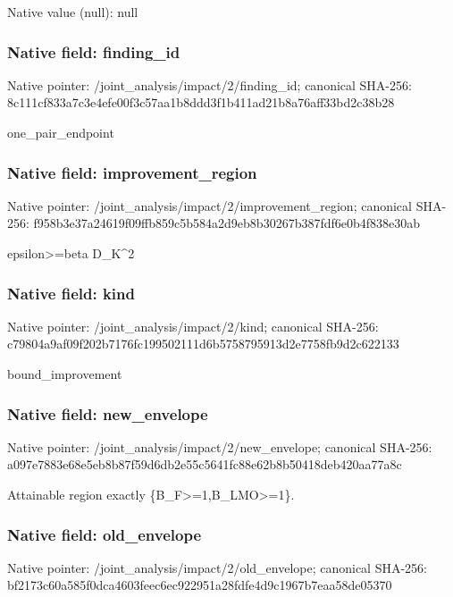 \documentclass[10pt,a4paper]{article}
\begin{document}
Native value (null): null

\subsubsection{Native field: finding\_\allowbreak{}id}
Native pointer: /joint\_\allowbreak{}analysis/impact/2/finding\_\allowbreak{}id; canonical SHA-256: 8c111cf833a7c3e4efe00f3c57aa1b8ddd3f1b411ad21b8a76aff33bd2c38b28

\begingroup\raggedright\sloppy one\_\allowbreak{}pair\_\allowbreak{}endpoint\par\endgroup

\subsubsection{Native field: improvement\_\allowbreak{}region}
Native pointer: /joint\_\allowbreak{}analysis/impact/2/improvement\_\allowbreak{}region; canonical SHA-256: f958b3e37a24619f09ffb859c5b584a2d9eb8b30267b387fdf6e0b4f838e30ab

\begingroup\raggedright\sloppy epsilon>=\allowbreak{}beta D\_\allowbreak{}K\textasciicircum{}2\par\endgroup

\subsubsection{Native field: kind}
Native pointer: /joint\_\allowbreak{}analysis/impact/2/kind; canonical SHA-256: c79804a9af09f202b7176fc199502111d6b5758795913d2e7758fb9d2c622133

\begingroup\raggedright\sloppy bound\_\allowbreak{}improvement\par\endgroup

\subsubsection{Native field: new\_\allowbreak{}envelope}
Native pointer: /joint\_\allowbreak{}analysis/impact/2/new\_\allowbreak{}envelope; canonical SHA-256: a097e7883e68e5eb8b87f59d6db2e55c5641fc88e62b8b50418deb420aa77a8c

\begingroup\raggedright\sloppy Attainable region exactly \{B\_\allowbreak{}F>=\allowbreak{}1,\allowbreak{}B\_\allowbreak{}LMO>=\allowbreak{}1\}.\par\endgroup

\subsubsection{Native field: old\_\allowbreak{}envelope}
Native pointer: /joint\_\allowbreak{}analysis/impact/2/old\_\allowbreak{}envelope; canonical SHA-256: bf2173c60a585f0dca4603feec6ec922951a28fdfe4d9c1967b7eaa58de05370
\end{document}
